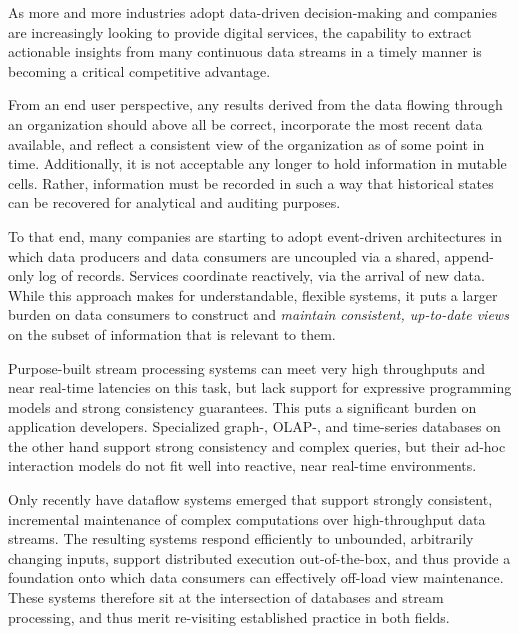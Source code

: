 \documentclass[../index.tex]{subfiles}
\begin{document}
As more and more industries adopt data-driven decision-making and
companies are increasingly looking to provide digital services, the
capability to extract actionable insights from many continuous data
streams in a timely manner is becoming a critical competitive
advantage.

From an end user perspective, any results derived from the data
flowing through an organization should above all be correct,
incorporate the most recent data available, and reflect a consistent
view of the organization as of some point in time. Additionally, it is
not acceptable any longer to hold information in mutable
cells. Rather, information must be recorded in such a way that
historical states can be recovered for analytical and auditing
purposes.

To that end, many companies are starting to adopt event-driven
architectures in which data producers and data consumers are uncoupled
via a shared, append-only log of records. Services coordinate
reactively, via the arrival of new data. While this approach makes for
understandable, flexible systems, it puts a larger burden on data
consumers to construct and \emph{maintain consistent, up-to-date
  views} on the subset of information that is relevant to them.

Purpose-built stream processing systems can meet very high throughputs
and near real-time latencies on this task, but lack support for
expressive programming models and strong consistency guarantees. This
puts a significant burden on application developers. Specialized
graph-, OLAP-, and time-series databases on the other hand support
strong consistency and complex queries, but their ad-hoc interaction
models do not fit well into reactive, near real-time environments.

Only recently have dataflow systems emerged that support strongly
consistent, incremental maintenance of complex computations over
high-throughput data streams. The resulting systems respond
efficiently to unbounded, arbitrarily changing inputs, support
distributed execution out-of-the-box, and thus provide a foundation
onto which data consumers can effectively off-load view
maintenance. These systems therefore sit at the intersection of
databases and stream processing, and thus merit re-visiting
established practice in both fields.
\end{document}
